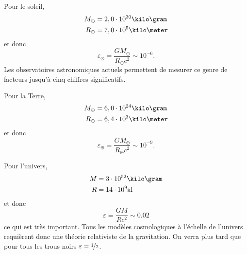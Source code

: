 \documentclass[a4paper,11pt]{report}
\begin{document}
        \begin{exmp}
            Pour le soleil,
            \begin{align*}
                M_\odot &= 2,0\cdot10^{30}\kilo\gram \\
                R_\odot &= 7,0\cdot10^{5}\kilo\meter
            \end{align*}
            et donc
            \begin{equation}
                \varepsilon_\odot  = \frac{GM_\odot}{R_\odot c^2}\sim 10^{-6}.
            \end{equation}
            Les observatoires astronomiques actuels permettent de mesurer ce genre de facteurs jusqu'à cinq chiffres significatifs. 
        \end{exmp}
        \begin{exmp}
            Pour la Terre,
            \begin{align*}
                M_\oplus &= 6,0\cdot10^{24}\kilo\gram \\
                R_\oplus &= 6,4\cdot10^{3}\kilo\meter
            \end{align*}
            et donc
            \begin{equation}
                \varepsilon_\oplus = \frac{GM_\oplus}{R_\oplus c^2}\sim 10^{-9}.
            \end{equation}
        \end{exmp}
        \begin{exmp}
            Pour l'univers,
            \begin{align*}
                M &= 3\cdot10^{52}\kilo\gram \\
                R &= 14\cdot10^{9}\text{al}
            \end{align*}
            et donc
            \begin{equation}
                \varepsilon = \frac{GM}{Rc^2}\sim 0.02
            \end{equation}
            ce qui est très important. Tous les modèles cosmologiques à l'échelle de l'univers requièrent donc une théorie relativiste de la gravitation. On verra plus tard que pour tous les trous noirs $\varepsilon = \nicefrac{1}{2}$.
        \end{exmp}
        
\end{document}
